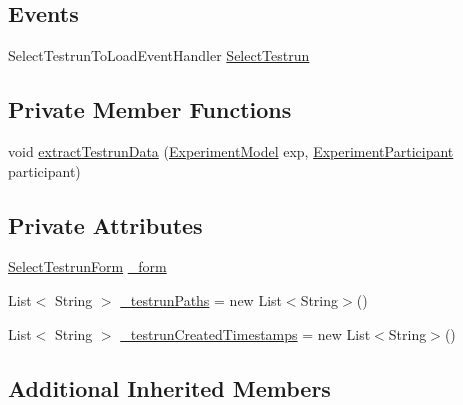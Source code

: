 \subsection*{Events}
\begin{DoxyCompactItemize}
\item 
Select\+Testrun\+To\+Load\+Event\+Handler \hyperlink{class_web_analyzer_1_1_u_i_1_1_interaction_objects_1_1_select_testrun_control_add98c79fa38a7db09d583d84dbbce933}{Select\+Testrun}
\end{DoxyCompactItemize}
\subsection*{Private Member Functions}
\begin{DoxyCompactItemize}
\item 
void \hyperlink{class_web_analyzer_1_1_u_i_1_1_interaction_objects_1_1_select_testrun_control_af9998f85a18a001b4c20570ac957c40c}{extract\+Testrun\+Data} (\hyperlink{class_web_analyzer_1_1_models_1_1_base_1_1_experiment_model}{Experiment\+Model} exp, \hyperlink{class_web_analyzer_1_1_models_1_1_base_1_1_experiment_participant}{Experiment\+Participant} participant)
\end{DoxyCompactItemize}
\subsection*{Private Attributes}
\begin{DoxyCompactItemize}
\item 
\hyperlink{class_web_analyzer_1_1_u_i_1_1_select_testrun_form}{Select\+Testrun\+Form} \hyperlink{class_web_analyzer_1_1_u_i_1_1_interaction_objects_1_1_select_testrun_control_a39d7aa4b858b7a69589227169ef632b3}{\+\_\+form}
\item 
List$<$ String $>$ \hyperlink{class_web_analyzer_1_1_u_i_1_1_interaction_objects_1_1_select_testrun_control_a0c0086c3100ebc268548423ac421a27e}{\+\_\+testrun\+Paths} = new List$<$String$>$()
\item 
List$<$ String $>$ \hyperlink{class_web_analyzer_1_1_u_i_1_1_interaction_objects_1_1_select_testrun_control_a489ec01aa0eab6ff4438bee2532900b3}{\+\_\+testrun\+Created\+Timestamps} = new List$<$String$>$()
\end{DoxyCompactItemize}
\subsection*{Additional Inherited Members}



